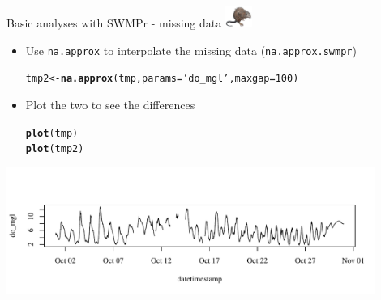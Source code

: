 \documentclass[xcolor=dvipsnames]{beamer}\usepackage[]{graphicx}\usepackage[]{color}
\makeatletter
\newcommand{\hlnum}[1]{\textcolor[rgb]{0.686,0.059,0.569}{#1}}%
\newcommand{\hlstr}[1]{\textcolor[rgb]{0.192,0.494,0.8}{#1}}%
\newcommand{\hlstd}[1]{\textcolor[rgb]{0.345,0.345,0.345}{#1}}%
\newcommand{\hlkwb}[1]{\textcolor[rgb]{0.69,0.353,0.396}{#1}}%
\newcommand{\hlkwc}[1]{\textcolor[rgb]{0.333,0.667,0.333}{#1}}%
\newcommand{\hlkwd}[1]{\textcolor[rgb]{0.737,0.353,0.396}{\textbf{#1}}}%
\newenvironment{kframe}{%
 \def\at@end@of@kframe{}%
 \ifinner\ifhmode%
  \def\at@end@of@kframe{\end{minipage}}%
  \begin{minipage}{\columnwidth}%
 \fi\fi%
 \def\FrameCommand##1{\hskip\@totalleftmargin \hskip-\fboxsep
 \colorbox{shadecolor}{##1}\hskip-\fboxsep
     \hskip-\linewidth \hskip-\@totalleftmargin \hskip\columnwidth}%
 \MakeFramed {\advance\hsize-\width
   \@totalleftmargin\z@ \linewidth\hsize
   \@setminipage}}%
 {\par\unskip\endMakeFramed%
 \at@end@of@kframe}
\newenvironment{knitrout}{}{} %
\makeatother
\begin{document}
\begin{frame}[fragile]{Basic analyses with SWMPr - missing data \includegraphics[width = 0.065\textwidth]{imgs/swmprat.png}}
\begin{itemize}
\item {}
Use \texttt{na.approx} to interpolate the missing data (\texttt{na.approx.swmpr})
\begin{knitrout}\scriptsize
{}\color{fgcolor}\begin{kframe}
\begin{alltt}
\hlstd{tmp2} \hlkwb{<-} \hlkwd{na.approx}\hlstd{(tmp,} \hlkwc{params} \hlstd{=} \hlstr{'do_mgl'}\hlstd{,} \hlkwc{maxgap} \hlstd{=} \hlnum{100}\hlstd{)}
\end{alltt}
\end{kframe}
\end{knitrout}
\vspace{0.1in}
\item {}
Plot the two to see the differences
\begin{knitrout}\scriptsize
{}\color{fgcolor}\begin{kframe}
\begin{alltt}
\hlkwd{plot}\hlstd{(tmp)}
\hlkwd{plot}\hlstd{(tmp2)}
\end{alltt}
\end{kframe}
\end{knitrout}
\end{itemize}
\vspace{-0.4in}
\begin{knitrout}\scriptsize
{}\color{fgcolor}

{\centering \includegraphics[width=0.9\textwidth]{figure/unnamed-chunk-9-1} 

}




\end{knitrout}
\end{frame}
\end{document}
